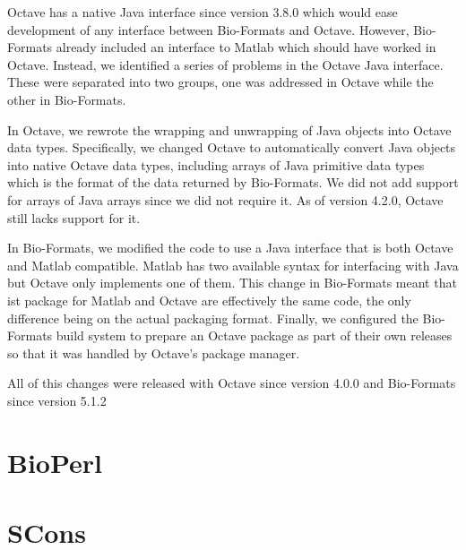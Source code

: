 Octave has a native Java interface since version 3.8.0 which would
ease development of any interface between Bio-Formats and Octave.
However, Bio-Formats already included an interface to Matlab which
should have worked in Octave.  Instead, we identified a series of
problems in the Octave Java interface.  These were separated into two
groups, one was addressed in Octave while the other in Bio-Formats.

In Octave, we rewrote the wrapping and unwrapping of Java objects into
Octave data types.  Specifically, we changed Octave to automatically
convert Java objects into native Octave data types, including arrays
of Java primitive data types which is the format of the data returned
by Bio-Formats.  We did not add support for arrays of Java arrays
since we did not require it.  As of version 4.2.0, Octave still lacks
support for it.

In Bio-Formats, we modified the code to use a Java interface that is
both Octave and Matlab compatible.  Matlab has two available syntax
for interfacing with Java but Octave only implements one of them.
This change in Bio-Formats meant that ist package for Matlab and
Octave are effectively the same code, the only difference being on the
actual packaging format.  Finally, we configured the Bio-Formats build
system to prepare an Octave package as part of their own releases so
that it was handled by Octave's package manager.

All of this changes were released with Octave since version 4.0.0 and
Bio-Formats since version 5.1.2

\section{BioPerl}

\section{SCons}
